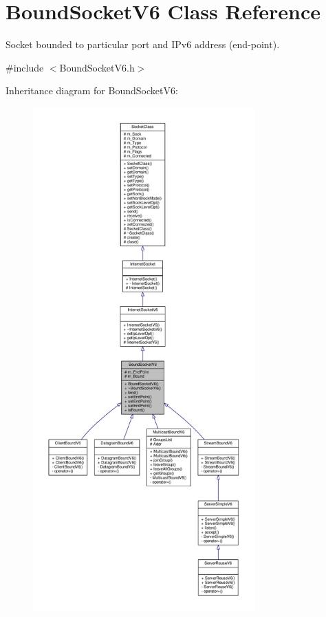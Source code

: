 \hypertarget{classBoundSocketV6}{}\section{Bound\+Socket\+V6 Class Reference}
\label{classBoundSocketV6}


Socket bounded to particular port and I\+Pv6 address (end-\/point).  




{\ttfamily \#include $<$Bound\+Socket\+V6.\+h$>$}



Inheritance diagram for Bound\+Socket\+V6\+:\nopagebreak
\begin{figure}[H]
\begin{center}
\leavevmode
\includegraphics[height=550pt]{classBoundSocketV6__inherit__graph}
\end{center}
\end{figure}
